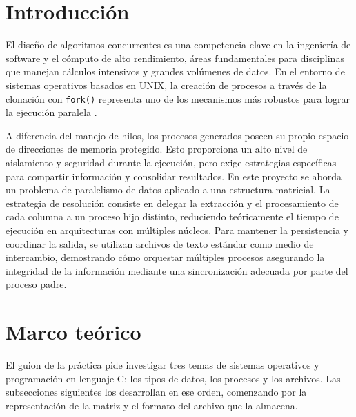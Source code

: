\section{Introducción}
\label{sec:prac02:introduccion}

El diseño de algoritmos concurrentes es una competencia clave en la ingeniería de software y el cómputo de alto rendimiento, áreas fundamentales para disciplinas que manejan cálculos intensivos y grandes volúmenes de datos. En el entorno de sistemas operativos basados en UNIX, la creación de procesos a través de la clonación con \texttt{fork()} representa uno de los mecanismos más robustos para lograr la ejecución paralela \cite{marquez:unix-programacion:2015}.

A diferencia del manejo de hilos, los procesos generados poseen su propio espacio de direcciones de memoria protegido. Esto proporciona un alto nivel de aislamiento y seguridad durante la ejecución, pero exige estrategias específicas para compartir información y consolidar resultados. En este proyecto se aborda un problema de paralelismo de datos aplicado a una estructura matricial. La estrategia de resolución consiste en delegar la extracción y el procesamiento de cada columna a un proceso hijo distinto, reduciendo teóricamente el tiempo de ejecución en arquitecturas con múltiples núcleos. Para mantener la persistencia y coordinar la salida, se utilizan archivos de texto estándar como medio de intercambio, demostrando cómo orquestar múltiples procesos asegurando la integridad de la información mediante una sincronización adecuada por parte del proceso padre.


\section{Marco teórico}
\label{sec:prac02:marco-teorico}

El guion de la práctica pide investigar tres temas de sistemas operativos y programación en lenguaje C: los tipos de datos, los procesos y los archivos. Las subsecciones siguientes los desarrollan en ese orden, comenzando por la representación de la matriz y el formato del archivo que la almacena.


